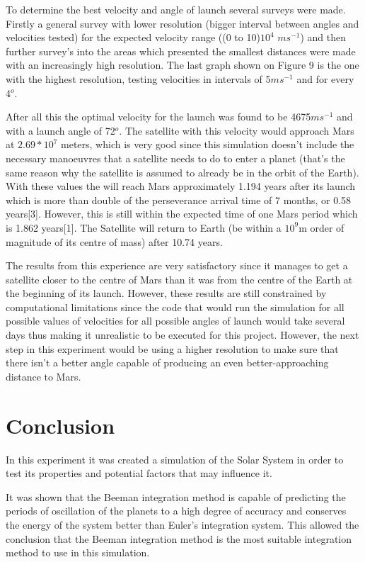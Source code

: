 \documentclass{article}
\begin{document}
{To determine the best velocity and angle of launch several surveys were made. Firstly a general survey with lower resolution (bigger interval between angles and velocities tested) for the expected velocity range ((0 to 10)$10^4$ $ms^{-1}$) and then further survey's into the areas which presented the smallest distances were made with an increasingly high resolution. The last graph shown on Figure 9 is the one with the highest resolution, testing velocities in intervals of 5$ms^{-1}$ and for every 4$^o$.}

{After all this the optimal velocity for the launch was found to be 4675$ms^{-1}$ and with a launch angle of 72$^o$. The satellite with this velocity would approach Mars at $2.69 * 10^7$ meters, which is very good since this simulation doesn't include the necessary manoeuvres that a satellite needs to do to enter a planet (that's the same reason why the satellite is assumed to already be in the orbit of the Earth). With these values the  will reach Mars approximately 1.194 years after its launch which is more than double of the perseverance arrival time of 7 months, or 0.58 years[3]. However, this is still within the expected time of one Mars period which is 1.862 years[1]. The Satellite will return to Earth (be within a $10^9$m order of magnitude of its centre of mass) after 10.74 years.}

{The results from this experience are very satisfactory since it manages to get a satellite closer to the centre of Mars than it was from the centre of the Earth at the beginning of its launch. However, these results are still constrained by computational limitations since the code that would run the simulation for all possible values of velocities for all possible angles of launch would take several days thus making it unrealistic to be executed for this project. However, the next step in this experiment would be using a higher resolution to make sure that there isn't a better angle capable of producing an even better-approaching distance to Mars.}

\section{Conclusion}

{In this experiment it was created a simulation of the Solar System in order to test its properties and potential factors that may influence it. }

{It was shown that the Beeman integration method is capable of predicting the periods of oscillation of the planets to a high degree of accuracy and conserves the energy of the system better than Euler's integration system. This allowed the conclusion that the Beeman integration method is the most suitable integration method to use in this simulation. }
\end{document}
